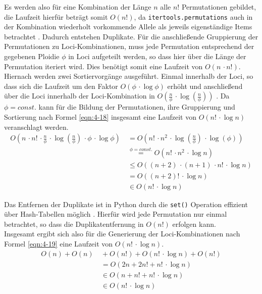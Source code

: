 Es werden also für eine Kombination der Länge $n$ alle $n!$ Permutationen gebildet, die Laufzeit hierfür beträgt somit $ O(n!) $, da \lstinline|itertools.permutations| auch in der Kombination wiederholt vorkommende Allele als jeweils eigenständige Items betrachtet \cite{itertools}. Dadurch entstehen Duplikate. Für die anschließende Gruppierung der Permutationen zu Loci-Kombinationen, muss jede Permutation entsprechend der gegebenen Ploidie $\phi$ in Loci aufgeteilt werden, so dass hier über die Länge der Permutation iteriert wird. Dies benötigt somit eine Laufzeit von $O(n  \, \cdotp n!)$. Hiernach werden zwei Sortiervorgänge ausgeführt. Einmal innerhalb der Loci, so dass sich die Laufzeit um den Faktor $O(\phi\, \cdotp \log\phi)$ erhöht und anschließend über die Loci innerhalb der Loci-Kombination in $ O\left( \frac{n}{\phi}\, \cdotp \log\left( \frac{n}{\phi}\right)\right)  $ \cite{python-sort}. Da $\phi = const.$ kann für die Bildung der Permutationen, ihre Gruppierung und Sortierung nach Formel \eqref{eqn:4-18} insgesamt eine Laufzeit von $O\left( n! \, \cdotp \log n \right) $ veranschlagt werden. \\
\begin{equation} \label{eqn:4-18}
\tag{4-18}
\begin{aligned}
O\left( n \, \cdotp n! \, \cdotp \frac{n}{\phi}\, \cdotp \log\left( \frac{n}{\phi}\right) \, \cdotp \phi\, \cdotp \log\phi\right) &\ {} =  O\left( n! \, \cdotp n^2 \, \cdotp \log\left( \frac{n}{\phi}\right) \, \cdotp \log(\phi)\right)\\
&\ \stackrel{\phi = const.}{=} O\left( n! \, \cdotp n^2 \, \cdotp \log n \right)\\
&\ \leq O((n + 2) \, \cdotp (n + 1) \, \cdotp n! \, \cdotp \log n ) \\
&\ = O( (n + 2)! \, \cdotp \log n)\\
&\ \in O(n ! \, \cdotp \log n)
\end{aligned}
\end{equation}

Das Entfernen der Duplikate ist in Python durch die \lstinline|set()| Operation effizient über Hash-Tabellen  möglich \cite{python-sort}. Hierfür wird jede Permutation nur einmal betrachtet, so dass die Duplikatentfernung in $O(n!)$ erfolgen kann. \\

Insgesamt ergibt sich also für die Generierung der Loci-Kombinationen nach Formel \eqref{eqn:4-19} eine Laufzeit von $ O(n!\, \cdotp \log n) $.
\begin{equation} \label{eqn:4-19}
\tag{4-19}
\begin{aligned}
O(n) + O(n) &\ {} + O(n!) + O(n ! \, \cdotp \log n) + O(n!) \\
&\ = O(2n + 2 n! + n ! \, \cdotp \log n) \\
&\ {} \in O(n + n! + n ! \, \cdotp \log n)\\
&\ {} \in O(n ! \, \cdotp \log n)\\
\end{aligned}
\end{equation}

